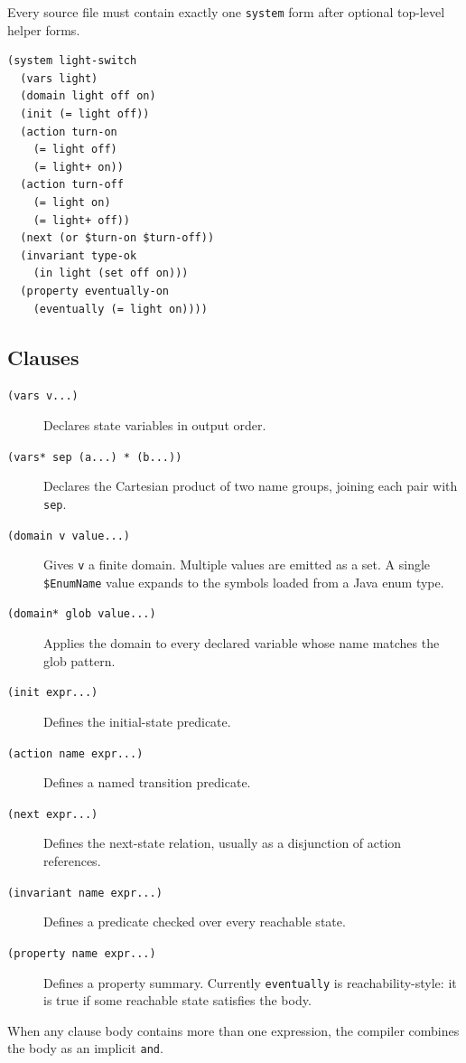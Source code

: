 \documentclass[11pt]{article}
\begin{document}
Every source file must contain exactly one \texttt{system} form after optional
top-level helper forms.

\begin{lstlisting}[language=DSTR]
(system light-switch
  (vars light)
  (domain light off on)
  (init (= light off))
  (action turn-on
    (= light off)
    (= light+ on))
  (action turn-off
    (= light on)
    (= light+ off))
  (next (or $turn-on $turn-off))
  (invariant type-ok
    (in light (set off on)))
  (property eventually-on
    (eventually (= light on))))
\end{lstlisting}

\subsection{Clauses}

\begin{description}
\item[\texttt{(vars v...)}] Declares state variables in output order.
\item[\texttt{(vars* sep (a...) * (b...))}] Declares the Cartesian product of
  two name groups, joining each pair with \texttt{sep}.
\item[\texttt{(domain v value...)}] Gives \texttt{v} a finite domain.  Multiple
  values are emitted as a set.  A single \texttt{\$EnumName} value expands to
  the symbols loaded from a Java enum type.
\item[\texttt{(domain* glob value...)}] Applies the domain to every declared
  variable whose name matches the glob pattern.
\item[\texttt{(init expr...)}] Defines the initial-state predicate.
\item[\texttt{(action name expr...)}] Defines a named transition predicate.
\item[\texttt{(next expr...)}] Defines the next-state relation, usually as a
  disjunction of action references.
\item[\texttt{(invariant name expr...)}] Defines a predicate checked over every
  reachable state.
\item[\texttt{(property name expr...)}] Defines a property summary.  Currently
  \texttt{eventually} is reachability-style: it is true if some reachable state
  satisfies the body.
\end{description}

When any clause body contains more than one expression, the compiler combines
the body as an implicit \texttt{and}.
\end{document}
